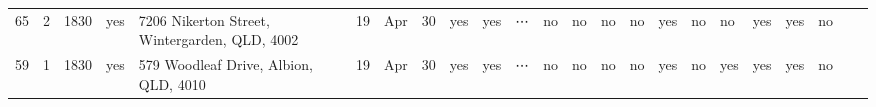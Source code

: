 \documentclass[11pt]{article}
\begin{document}
\begin{tabular}{r|llllllllllllllllllllll}
	 65                                                  & 2                                                   & 1830                                                & yes                                                 & 7206 Nikerton Street, Wintergarden, QLD, 4002       & 19                                                  & Apr                                                 &   30                                                & yes                                                 & yes                                                 & ⋯                                                   & no                                                  & no                                                  & no                                                  & no                                                  & yes                                                 & no                                                  & no                                                  & yes                                                 & yes                                                 & no                                                 \\
	 59                                                  & 1                                                   & 1830                                                & yes                                                 & 579 Woodleaf Drive, Albion, QLD, 4010               & 19                                                  & Apr                                                 &   30                                                & yes                                                 & yes                                                 & ⋯                                                   & no                                                  & no                                                  & no                                                  & no                                                  & yes                                                 & no                                                  & yes                                                 & yes                                                 & yes                                                 & no                                                 \\

\end{tabular}
\end{document}

